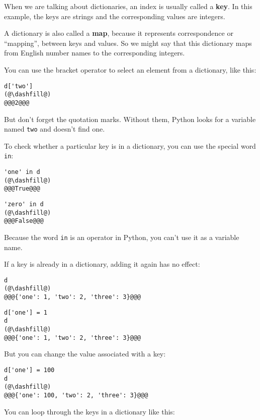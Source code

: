 When we are talking about dictionaries, an index is usually called a
\textbf{key}. In this example, the keys are strings and the
corresponding values are integers.

A dictionary is also called a \textbf{map}, because it represents
correspondence or ``mapping'', between keys and values. So we might say
that this dictionary maps from English number names to the corresponding
integers.

You can use the bracket operator to select an element from a dictionary,
like this:

\begin{lstlisting}[]
d['two']
(@\dashfill@)
@@@2@@@
\end{lstlisting}

But don't forget the quotation marks. Without them, Python looks for a
variable named \passthrough{\lstinline!two!} and doesn't find one.

To check whether a particular key is in a dictionary, you can use the
special word \passthrough{\lstinline!in!}:

\begin{lstlisting}[]
'one' in d
(@\dashfill@)
@@@True@@@
\end{lstlisting}

\begin{lstlisting}[]
'zero' in d
(@\dashfill@)
@@@False@@@
\end{lstlisting}

Because the word \passthrough{\lstinline!in!} is an operator in Python,
you can't use it as a variable name.

If a key is already in a dictionary, adding it again has no effect:

\begin{lstlisting}[]
d
(@\dashfill@)
@@@{'one': 1, 'two': 2, 'three': 3}@@@
\end{lstlisting}

\begin{lstlisting}[]
d['one'] = 1
d
(@\dashfill@)
@@@{'one': 1, 'two': 2, 'three': 3}@@@
\end{lstlisting}

But you can change the value associated with a key:

\begin{lstlisting}[]
d['one'] = 100
d
(@\dashfill@)
@@@{'one': 100, 'two': 2, 'three': 3}@@@
\end{lstlisting}

You can loop through the keys in a dictionary like this:

